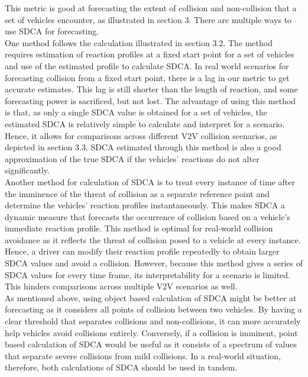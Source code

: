 \documentclass{article}
\begin{document}
This metric is good at forecasting the extent of collision and non-collision that a set of vehicles encounter, as illustrated in section 3. There are multiple ways to use SDCA for forecasting.\\
One method follows the calculation illustrated in section 3.2. The method requires estimation of reaction profiles at a fixed start point for a set of vehicles and use of the estimated profile to calculate SDCA. In real world scenarios for forecasting collision from a fixed start point, there is a lag in our metric to get accurate estimates. This lag is still shorter than the length of reaction, and some forecasting power is sacrificed, but not lost. The advantage of using this method is that, as only a single SDCA value is obtained for a set of vehicles, the estimated SDCA is relatively simple to calculate and interpret for a scenario. Hence, it allows for comparisons across different V2V collision scenarios, as depicted in section 3.3. SDCA estimated through this method is also a good approximation of the true SDCA if the vehicles' reactions do not alter significantly.\\
Another method for calculation of SDCA is to treat every instance of time after the imminence of the threat of collision as a separate reference point and determine the vehicles' reaction profiles instantaneously. This makes SDCA a dynamic measure that forecasts the occurrence of collision based on a vehicle's immediate reaction profile. This method is optimal for real-world collision avoidance as it reflects the threat of collision posed to a vehicle at every instance. Hence, a driver can modify their reaction profile repeatedly to obtain larger SDCA values and avoid a collision. However, because this method gives a series of SDCA values for every time frame, its interpretability for a scenario is limited. This hinders comparisons across multiple V2V scenarios as well.\\
As mentioned above, using object based calculation of SDCA might be better at forecasting as it considers all points of collision between two vehicles. By having a clear threshold that separates collisions and non-collisions, it can more accurately help vehicles avoid collisions entirely. Conversely, if a collision is imminent, point based calculation of SDCA would be useful as it consists of a spectrum of values that separate severe collisions from mild collisions. In a real-world situation, therefore, both calculations of SDCA should be used in tandem.\\
\end{document}
